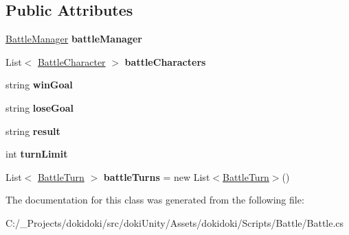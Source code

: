 \subsection*{Public Attributes}
\begin{DoxyCompactItemize}
\item 
\hyperlink{classdoki_battle_1_1_battle_manager}{Battle\+Manager} {\bfseries battle\+Manager}\hypertarget{classdoki_battle_1_1_battle_aae061a9a8dd6d3f4a4853eb730024f91}{}\label{classdoki_battle_1_1_battle_aae061a9a8dd6d3f4a4853eb730024f91}

\item 
List$<$ \hyperlink{classdoki_battle_1_1_battle_character}{Battle\+Character} $>$ {\bfseries battle\+Characters}\hypertarget{classdoki_battle_1_1_battle_a51fc3dba9c3e21598bc6814be3cc9ab8}{}\label{classdoki_battle_1_1_battle_a51fc3dba9c3e21598bc6814be3cc9ab8}

\item 
string {\bfseries win\+Goal}\hypertarget{classdoki_battle_1_1_battle_af27a0d66b8e32d7fb8173861090038c4}{}\label{classdoki_battle_1_1_battle_af27a0d66b8e32d7fb8173861090038c4}

\item 
string {\bfseries lose\+Goal}\hypertarget{classdoki_battle_1_1_battle_a0d59a465dfaab978e421d5f8fdad5505}{}\label{classdoki_battle_1_1_battle_a0d59a465dfaab978e421d5f8fdad5505}

\item 
string {\bfseries result}\hypertarget{classdoki_battle_1_1_battle_a8a9ef95fcd060ab6561d33cdaf723b48}{}\label{classdoki_battle_1_1_battle_a8a9ef95fcd060ab6561d33cdaf723b48}

\item 
int {\bfseries turn\+Limit}\hypertarget{classdoki_battle_1_1_battle_addf2d87f2ebbb643235708a629614dee}{}\label{classdoki_battle_1_1_battle_addf2d87f2ebbb643235708a629614dee}

\item 
List$<$ \hyperlink{classdoki_battle_1_1_battle_turn}{Battle\+Turn} $>$ {\bfseries battle\+Turns} = new List$<$\hyperlink{classdoki_battle_1_1_battle_turn}{Battle\+Turn}$>$()\hypertarget{classdoki_battle_1_1_battle_a8451191f506b2f7c99b30b038a141b40}{}\label{classdoki_battle_1_1_battle_a8451191f506b2f7c99b30b038a141b40}

\end{DoxyCompactItemize}


The documentation for this class was generated from the following file\+:\begin{DoxyCompactItemize}
\item 
C\+:/\+\_\+\+Projects/dokidoki/src/doki\+Unity/\+Assets/dokidoki/\+Scripts/\+Battle/Battle.\+cs\end{DoxyCompactItemize}
